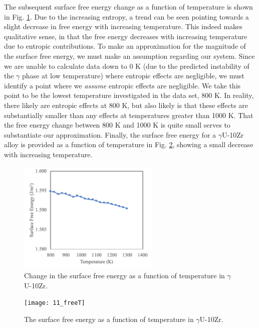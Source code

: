 \documentclass[review]{elsarticle}
\begin{document}
The subsequent surface free energy change as a function of temperature is shown in Fig. \ref{fig:free}.  Due to the increasing entropy, a trend can be seen pointing towards a slight decrease in free energy with increasing temperature. This indeed makes qualitative sense, in that the free energy decreases with increasing temperature due to entropic contributions. To make an approximation for the magnitude of the surface free energy, we must make an assumption regarding our system. Since we are unable to calculate data down to 0 K (due to the predicted instability of the $\gamma$ phase at low temperature) where entropic effects are negligible, we must identify a point where we \textit{assume} entropic effects are negligible. We take this point to be the lowest temperature investigated in the data set, 800 K. In reality, there likely are entropic effects at 800 K, but also likely is that these effects are substantially smaller than any effects at temperatures greater than 1000 K. That the free energy change between 800 K and 1000 K is quite small serves to substantiate our approximation. Finally, the surface free energy for a $\gamma$U-10Zr alloy is provided as a function of temperature in Fig. \ref{fig:freeT}, showing a small decrease with increasing temperature. 

\begin{figure}[!htp]
\begin{center}
\includegraphics[width=0.6\textwidth]{10_free}
\end{center}
\caption{Change in the surface free energy as a function of temperature in $\gamma$U-10Zr.}
\label{fig:free}
\end{figure}

\begin{figure}[!htp]
\begin{center}
\texttt{[image: 11\_freeT]}
\end{center}
\caption{The surface free energy as a function of temperature in $\gamma$U-10Zr.}
\label{fig:freeT}
\end{figure}
\end{document}
